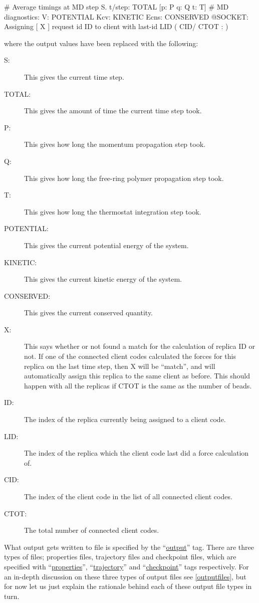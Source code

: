 \documentclass[11pt,english,fleqn]{report}
\newenvironment{code}{%
\footnotesize 
\verbatim
}{
\endverbatim
\normalsize
}
\begin{document}
\begin{code}
 # Average timings at MD step S. t/step: TOTAL [p: P q: Q t: T]
 # MD diagnostics: V: POTENTIAL Kcv: KINETIC Ecns: CONSERVED
 @SOCKET: Assigning [ X ] request id ID to client with last-id LID ( CID/ CTOT : )
\end{code}
where the output values have been replaced with the following:
\begin{description}
\item [{S:}] This gives the current time step.
\item[{TOTAL:}] This gives the amount of time the current time step took.
\item [{P:}] This gives how long the momentum propagation step took.
\item [{Q:}] This gives how long the free-ring polymer propagation step took.
\item [{T:}] This gives how long the thermostat integration step took.
\item [{POTENTIAL:}] This gives the current potential energy of the system.
\item [{KINETIC:}] This gives the current kinetic energy of the system.
\item [{CONSERVED:}] This gives the current conserved quantity.
\item [{X:}] This says whether or not \ipi found a match for the calculation of 
replica ID or not.
If one of the connected client codes calculated the forces for this replica on the
last time step, then X will be {}``match'', and \ipi will automatically assign
this replica to the same client as before. This should happen with all the replicas
if CTOT is the same as the number of beads.
\item [{ID:}] The index of the replica currently being assigned to a client code.
\item [{LID:}] The index of the replica which the client code last did a force calculation
of.
\item [{CID:}] The index of the client code in the list of all connected client codes.
\item [{CTOT:}] The total number of connected client codes.
\end{description}

What output gets written to file is specified by the 
{}``\hyperref[OUTPUTS]{output}'' tag.
There are three types of files; properties files, 
trajectory files and checkpoint files, which are specified with 
{}``\hyperref[PROPERTIES]{properties}'', 
{}``\hyperref[TRAJECTORY]{trajectory}'' 
and {}``\hyperref[CHECKPOINT]{checkpoint}'' tags respectively.
For an in-depth discussion on these three types
of output files see \ref{outputfiles}, 
but for now let us just explain the rationale
behind each of these output file types in turn.
\end{document}
